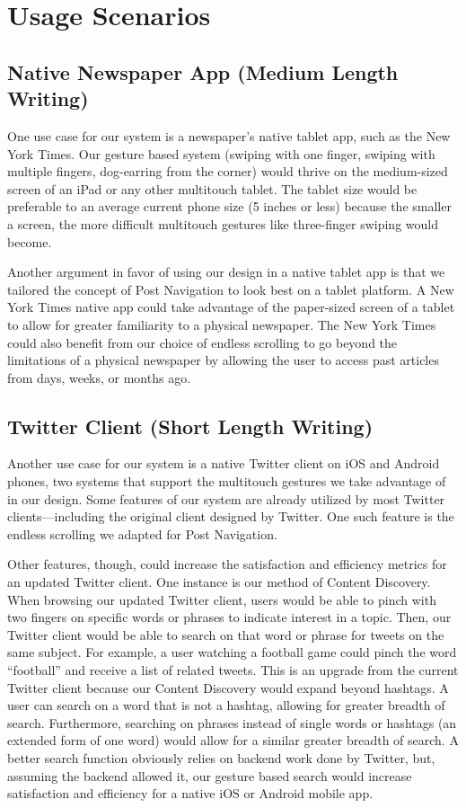 \documentclass[11pt, oneside]{article}   	%
\begin{document}
\section{Usage Scenarios}
\subsection{Native Newspaper App (Medium Length Writing)}
One use case for our system is a newspaper's native tablet app, such as the New York Times. Our gesture based system (swiping with one finger, swiping with multiple fingers, dog-earring from the corner) would thrive on the medium-sized screen of an iPad or any other multitouch tablet. The tablet size would be preferable to an average current phone size (5 inches or less) because the smaller a screen, the more difficult multitouch gestures like three-finger swiping would become.

Another argument in favor of using our design in a native tablet app is that we tailored the concept of Post Navigation to look best on a tablet platform. A New York Times native app could take advantage of the paper-sized screen of a tablet to allow for greater familiarity to a physical newspaper. The New York Times could also benefit from our choice of endless scrolling to go beyond the limitations of a physical newspaper by allowing the user to access past articles from days, weeks, or months ago.

\subsection{Twitter Client (Short Length Writing)}
Another use case for our system is a native Twitter client on iOS and Android phones, two systems that support the multitouch gestures we take advantage of in our design. Some features of our system are already utilized by most Twitter clients---including the original client designed by Twitter. One such feature is the endless scrolling we adapted for Post Navigation. 

Other features, though, could increase the satisfaction and efficiency metrics for an updated Twitter client. One instance is our method of Content Discovery. When browsing our updated Twitter client, users would be able to pinch with two fingers on specific words or phrases to indicate interest in a topic. Then, our Twitter client would be able to search on that word or phrase for tweets on the same subject. For example, a user watching a football game could pinch the word ``football'' and receive a list of related tweets. This is an upgrade from the current Twitter client because our Content Discovery would expand beyond hashtags. A user can search on a word that is not a hashtag, allowing for greater breadth of search. Furthermore, searching on phrases instead of single words or hashtags (an extended form of one word) would allow for a similar greater breadth of search. A better search function obviously relies on backend work done by Twitter, but, assuming the backend allowed it, our gesture based search would increase satisfaction and efficiency for a native iOS or Android mobile app.
\end{document}
